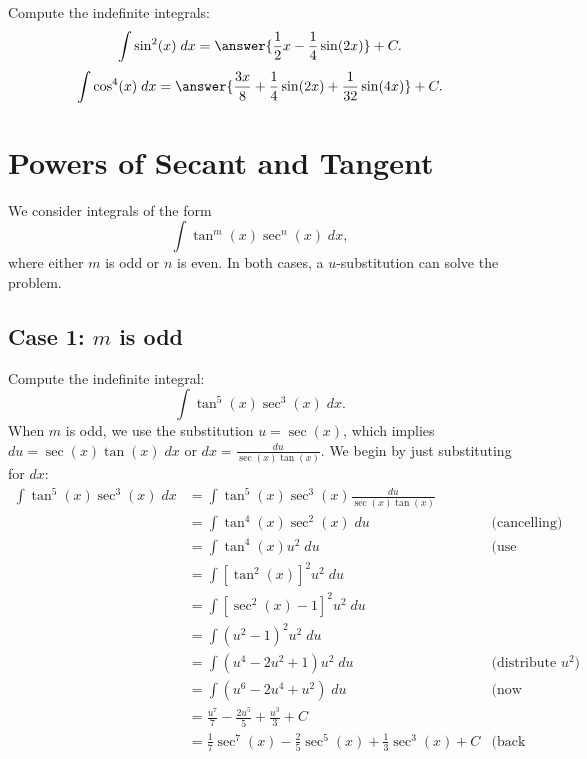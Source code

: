 \documentclass{ximera}
\begin{document}
\begin{problem}
Compute the indefinite integrals:
\[
\int \sin^2(x) \; dx = \answer{\frac12 x - \frac14 \sin(2x)} + C.
\]
\[
\int \cos^4(x) \; dx = \answer{\frac{3x}{8} +\frac14 \sin(2x) + \frac{1}{32}\sin(4x)} + C.
\]
\end{problem}

\section{Powers of Secant and Tangent}
We consider integrals of the form
\[
\int \tan^m(x)\sec^n(x) \; dx,
\]
where either $m$ is odd or $n$ is even. In both cases, a $u$-substitution
can solve the problem. 

\subsection{Case 1: $m$ is odd}
\begin{example}
Compute the indefinite integral:
\[
\int \tan^5(x) \sec^3(x)\;dx.
\]
When $m$ is odd, we use the substitution $u = \sec(x)$,
which implies $du = \sec(x) \tan(x) \; dx$ or $dx = \frac{du}{\sec(x)\tan(x)}$.
We begin by just substituting for $dx$:
\begin{align*}
\int \tan^5(x) \sec^3(x)\;dx &= \int \tan^5(x) \sec^3(x) \frac{du}{\sec(x)\tan(x)}\\
&= \int \tan^4(x) \sec^2(x) \; du & \text{(cancelling)}\\
&= \int \tan^4(x) u^2 \; du & \text{(use Pythagorean identity)}\\
&= \int \left[\tan^2(x)\right]^2 u^2 \; du \\
&= \int \left[\sec^2(x) -1\right]^2 u^2 \; du \\
&= \int \left(u^2 -1\right)^2 u^2 \; du \\
&= \int \left(u^4 - 2u^2 +1\right) u^2 \; du & \text{(distribute $u^2$)}\\
&= \int \left(u^6 - 2u^4 +u^2\right) \; du & \text{(now integrate)}\\
&=  \frac{u^7}{7} - \frac{2u^5}{5} + \frac{u^3}{3} + C  \\
&= \frac17\sec^7(x) - \frac25 \sec^5(x) + \frac13 \sec^3(x) + C & \text{(back substituting)}
\end{align*}
\end{example}



\begin{center}
\begin{foldable}
\end{foldable}
\end{center}
\end{document}
